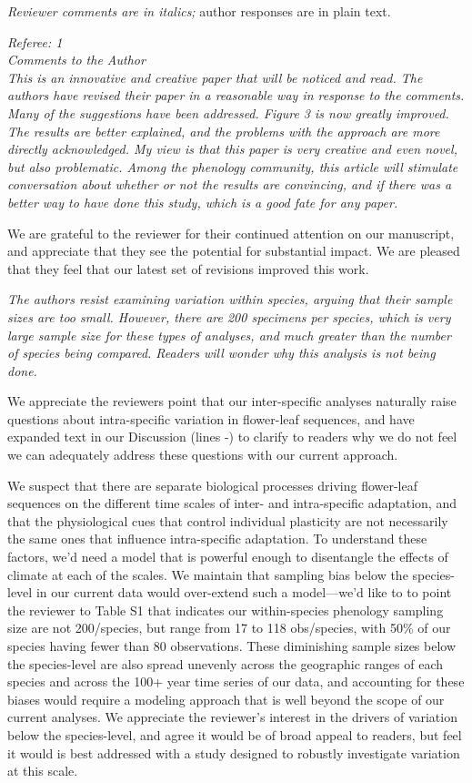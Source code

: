 \documentclass{article}[12pt]
\begin{document}


\emph{Reviewer comments are in italics;} author responses are in plain text.

\emph{Referee: 1}\\
\emph{Comments to the Author}\\
\emph{This is an innovative and creative paper that will be noticed and read. The authors have revised their paper in a reasonable way in response to the comments. Many of the suggestions have been addressed.  Figure 3 is now greatly improved. The results are better explained, and the problems with the approach are more directly acknowledged. My view is that this paper is very creative and even novel, but also problematic. Among the phenology community, this article will stimulate conversation about whether or not the results are convincing, and if there was a better way to have done this study, which is a good fate for any paper.}

We are grateful to the reviewer for their continued attention on our manuscript, and appreciate that they see the potential for substantial impact. We are pleased that they feel that our latest set of revisions improved this work. 

\emph{The authors resist examining variation within species, arguing that their sample sizes are too small. However, there are 200 specimens per species, which is very large sample size for these types of analyses, and much greater than the number of species being compared.  Readers will wonder why this analysis is not being done.}

We appreciate the reviewers point that our inter-specific analyses naturally raise questions about intra-specific variation in flower-leaf sequences, and have expanded text in our Discussion (lines -) to clarify to readers why we do not feel we can adequately address these questions with our current approach.

We suspect that there are separate biological processes driving flower-leaf sequences on the different time scales of inter- and intra-specific adaptation, and that the physiological cues that control individual plasticity are not necessarily the same ones that influence intra-specific adaptation. To understand these factors, we'd need a model that is powerful enough to disentangle the effects of climate at each of the scales. We maintain that sampling bias below the species-level in our current data would over-extend such a model---we'd like to to point the reviewer to Table S1 that indicates our within-species phenology sampling size are not 200/species, but range from 17 to 118 obs/species, with 50\% of our species having fewer than 80 observations. These diminishing sample sizes below the species-level are also spread unevenly across the geographic ranges of each species and across the 100+ year time series of our data, and accounting for these biases would require a modeling approach that is well beyond the scope of our current analyses. We appreciate the reviewer's interest in the drivers of variation below the species-level, and agree it would be of broad appeal to readers, but feel it would is best addressed with a study designed to robustly investigate variation at this scale.
\end{document}
